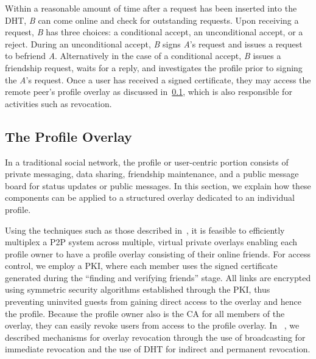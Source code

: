 Within a reasonable amount of time after a request has been inserted into the
DHT, \textit{B} can come online and check for outstanding requests.  Upon
receiving a request, \textit{B} has three choices: a conditional accept, an
unconditional accept, or a reject.  During an unconditional accept, \textit{B}
signs \textit{A}'s request and issues a request to befriend \textit{A}.
Alternatively in the case of a conditional accept, \textit{B} issues a friendship
request, waits for a reply, and investigates the profile prior to signing the
\textit{A}'s request.  Once a user has received a signed certificate,
they may access the remote peer's profile overlay as discussed
in~\ref{profile_overlay}, which is also responsible for activities such as
revocation.


\subsection{The Profile Overlay}
\label{profile_overlay}
In a traditional social network, the profile or user-centric portion consists
of private messaging, data sharing, friendship maintenance, and a
public message board for status updates or public messages.  In this
section, we explain how these components can be applied to a structured overlay
dedicated to an individual profile.

Using the techniques such as those described in~\cite{icdcs10}, it is feasible
to efficiently multiplex a P2P system across multiple, virtual private overlays enabling
each profile owner to have a profile overlay consisting of their online friends.
For access control, we employ a PKI, where each member uses the signed certificate
generated during the ``finding and verifying friends'' stage.  All links are
encrypted using symmetric security algorithms established through the PKI,
thus preventing uninvited guests from gaining direct access to the overlay and
hence the profile.  Because the profile owner also is the CA for all members of
the overlay, they can easily revoke users from access to the profile overlay.
In ~\cite{icdcs10}, we described mechanisms for overlay revocation through the
use of broadcasting for immediate revocation and the use of DHT for indirect
and permanent revocation.

